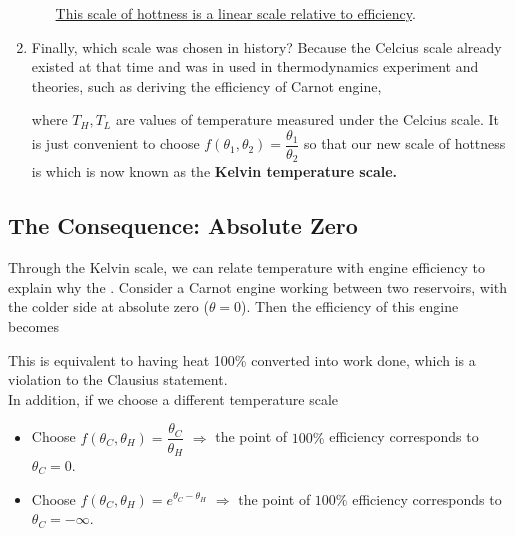 \documentclass[class=article, crop=false, 12pt]{standalone}
\begin{document}
\begin{enumerate}
\begin{itemize}

        \ul{This scale of hottness is a linear scale relative to efficiency}.

    \end{itemize}


    \item Finally, which scale was chosen in history? 
    Because the Celcius scale already existed at that time
    and was in used in thermodynamics experiment and theories, 
    such as deriving the efficiency of Carnot engine,

    where $T_H, T_L$ are values of temperature measured under the Celcius scale.
    It is just convenient to choose $f(\theta_1,\theta_2) = \dfrac{\theta_1}{\theta_2}$ so that our new scale of hottness is
    which is now known as the \bf{Kelvin temperature scale}.


\end{enumerate}

\subsection{The Consequence: Absolute Zero}

Through the Kelvin scale,
we can relate temperature with engine efficiency to explain why the . 
Consider a Carnot engine working between two reservoirs,
with the colder side at absolute zero ($\theta=0$).
Then the efficiency of this engine becomes


This is equivalent to having heat 100\% converted into work done,
which is a violation to the Clausius statement.\\

In addition, if we choose a different temperature scale 
\begin{itemize}
    \item Choose $f(\theta_C,\theta_H) = \dfrac{\theta_C}{\theta_H}$ \quad$\Rightarrow$\quad 
    the point of $100\%$ efficiency corresponds to $\theta_C=0$.

    \item Choose $f(\theta_C,\theta_H) = e^{\theta_C - \theta_H}$ \quad$\Rightarrow$\quad 
    the point of $100\%$ efficiency corresponds to $\theta_C=-\infty$.
\end{itemize}
\end{document}
